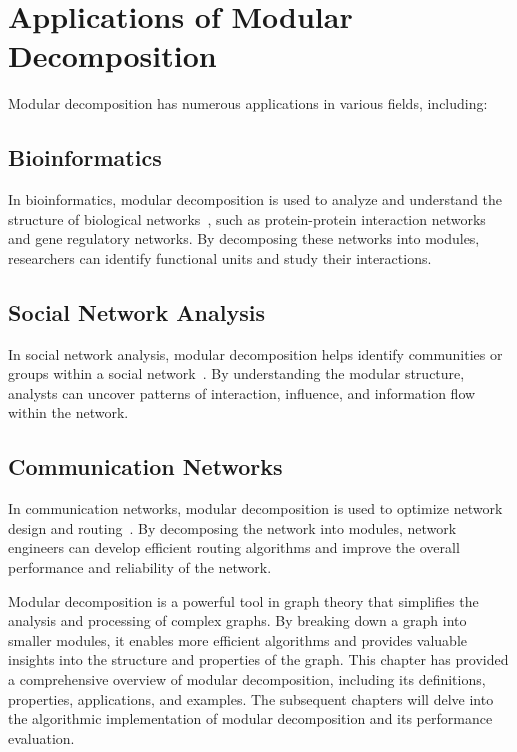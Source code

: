 \section{Applications of Modular Decomposition}\label{sec:applications-of-modular-decomposition}

Modular decomposition has numerous applications in various fields, including:

\subsection*{Bioinformatics}\label{subsec:bioinformatics}

In bioinformatics, modular decomposition is used to analyze and understand the structure of biological networks~\cite{MDPPIN}, such as protein-protein interaction networks and gene regulatory networks.
By decomposing these networks into modules, researchers can identify functional units and study their interactions.

\subsection*{Social Network Analysis}\label{subsec:social-network-analysis}

In social network analysis, modular decomposition helps identify communities or groups within a social network~\cite{NCCD}.
By understanding the modular structure, analysts can uncover patterns of interaction, influence, and information flow within the network.

\subsection*{Communication Networks}\label{subsec:communication-networks}

In communication networks, modular decomposition is used to optimize network design and routing~\cite{MANTP}.
By decomposing the network into modules, network engineers can develop efficient routing algorithms and improve the overall performance and reliability of the network.


\hspace{4cm}

Modular decomposition is a powerful tool in graph theory that simplifies the analysis and processing of complex graphs.
By breaking down a graph into smaller modules, it enables more efficient algorithms and provides valuable insights into the structure and properties of the graph.
This chapter has provided a comprehensive overview of modular decomposition, including its definitions, properties, applications, and examples.
The subsequent chapters will delve into the algorithmic implementation of modular decomposition and its performance evaluation.

